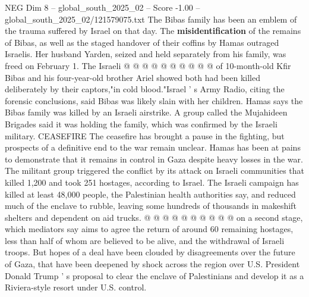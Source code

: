\begin{textsample}{NEG Dim 8 – global\_south\_2025\_02 – Score -1.00 – global\_south\_2025\_02/121579075.txt}
The Bibas family has been an emblem of the trauma suffered by Israel on that day.
The \textbf{misidentification} of the remains of Bibas, as well as the staged handover of their coffins by Hamas outraged Israelis.
Her husband Yarden, seized and held separately from his family, was freed on February 1.
The Israeli @ @ @ @ @ @ @ @ @ @ of 10-month-old Kfir Bibas and his four-year-old brother Ariel showed both had been killed deliberately by their captors,"in cold blood."Israel ' s Army Radio, citing the forensic conclusions, said Bibas was likely slain with her children.
Hamas says the Bibas family was killed by an Israeli airstrike.
A group called the Mujahideen Brigades said it was holding the family, which was confirmed by the Israeli military.
CEASEFIRE The ceasefire has brought a pause in the fighting, but prospects of a definitive end to the war remain unclear.
Hamas has been at pains to demonstrate that it remains in control in Gaza despite heavy losses in the war.
The militant group triggered the conflict by its attack on Israeli communities that killed 1,200 and took 251 hostages, according to Israel.
The Israeli campaign has killed at least 48,000 people, the Palestinian health authorities say, and reduced much of the enclave to rubble, leaving some hundreds of thousands in makeshift shelters and dependent on aid trucks. @ @ @ @ @ @ @ @ @ @ on a second stage, which mediators say aims to agree the return of around 60 remaining hostages, less than half of whom are believed to be alive, and the withdrawal of Israeli troops.
But hopes of a deal have been clouded by disagreements over the future of Gaza, that have been deepened by shock across the region over U.S.
President Donald Trump ' s proposal to clear the enclave of Palestinians and develop it as a Riviera-style resort under U.S. control.

\end{textsample}
